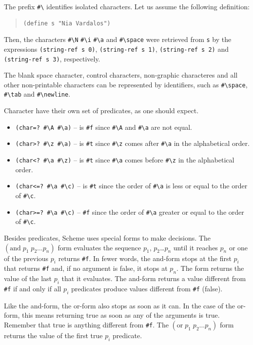 \documentclass[a4paper,12pt]{book}
\begin{document}
The prefix \verb|#\| identifies isolated
characters. Let us assume the following
definition:
\begin{quote}
\begin{verbatim}
(define s "Nia Vardalos")
\end{verbatim}
\end{quote}
Then, the characters
\verb|#\N| \verb|#\i| 
\verb|#\a| and \verb|#\space|
were retrieved from
\verb|s| by the
expressions \verb|(string-ref s 0)|,
\verb|(string-ref s 1)|,
\verb|(string-ref s 2)| and
\verb|(string-ref s 3)|,
\verb|| respectively.

The blank space character,  control
characters, non-graphic characteres
and all other non-printable characters
can be represented by
identifiers, such as \verb|#\space|,
\verb|#\tab| and \verb|#\newline|.

Character have their own set of
predicates, as one should expect.
\begin{itemize}
\item\verb|(char=? #\A #\a)| -- is \verb|#f|
since \verb|#\A| and \verb|#\a| are not equal.
\item\verb|(char>? #\z #\a)| -- is \verb|#t|
since \verb|#\z|  comes
after \verb|#\a| in the alphabetical order.
\item\verb|(char<? #\a #\z)| -- is \verb|#t|
since \verb|#\a| comes before \verb|#\z|
in the alphabetical order.
\item\verb|(char<=? #\a #\c)| -- is \verb|#t| since
the order of \verb|#\a| is less or equal to
the order of \verb|#\c|.
\item\verb|(char>=? #\a #\c)| -- \verb|#f| since
the order of \verb|#\a| greater or equal to the
order of \verb|#\c|.
\end{itemize}

Besides predicates, Scheme uses special forms
to make decisions. The $(\textrm{and}\; p_1\;
p_2\ldots p_n)$ form
evaluates the sequence $p_1$, $p_2$\ldots $p_n$
until it reaches $p_n$ or one of the previous
$p_i$ returns \verb|#f|. In fewer words,
the and-form stops at the first
$p_i$ that returns \verb|#f| and, if no
argument is false, it stops at $p_n$.
The form returns the value of the last
$p_i$ that it evaluates. The and-form
returns a value different from \verb|#f|
if and only if all $p_i$ predicates produce
values different from \verb|#f| (false).

Like the and-form, the or-form also stops
as soon as it can. In the case of the or-form,
this means returning true as soon as any
of the arguments is true. Remember that
true is anything different from \verb|#f|.
The  $(\textrm{or}\; p_1\;
p_2\ldots p_n)$ form returns the value
of the first true $p_i$ predicate.
\end{document}

